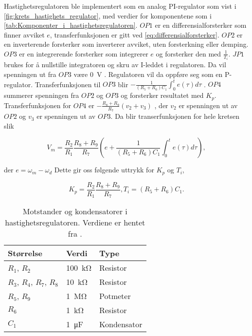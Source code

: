 Hastighetsregulatoren ble implementert som en analog PI-regulator som vist i \autoref{fig:krets_hastighets_regulator}, med verdier for komponentene som i \autoref{tab:Komponenter_i_hastighetsregulatoren}. $OP1$ er en differensialforsterker som finner avviket $e$, transferfunksjonen er gitt ved \eqref{eq:differensialforsterker}.
$OP2$ er en inverterende forsterker som inverterer avviket, uten forsterkning eller demping.
$OP3$ er en integrerende forsterker som integrerer $e$ og forsterker den med $\frac{1}{T_i}$.
$JP1$ brukes for å nullstille integratoren og skru av I-leddet i regulatoren.
Da vil spenningen ut fra $OP3$ være \SI{0}{\volt} \cite{AnalogMotorlabbOppgaver}.
Regulatoren vil da oppføre seg som en P-regulator.
Transferfunksjonen til $OP3$ blir $-\frac{1}{(R_5 + R_6) C_1} \int^t_0 e(\tau) d\tau$ \cite{Johnson}.
$OP4$ summerer spenningen fra $OP2$ og $OP3$ og forsterker resultatet med $K_p$.
Transferfunksjonen for $OP4$ er $-\frac{R_8 + R_9}{R_7}(v_2 + v_3)$ \cite{Johnson}, der $v_2$ er spenningen ut av $OP2$ og $v_3$ er spenningen ut av $OP3$. 
Da blir transerfunksjonen for hele kretsen slik

\begin{equation}
    \label{eq:hastighet_regulator_transferfuksjon}
    V_m =
    \frac{R_2}{R_1} \frac{R_8 + R_9}{R_7} \left(e + \frac{1}{(R_5 + R_6) C_1} \int^t_0 e(\tau) d\tau \right),
\end{equation}

der $e = \omega_m - \omega_d$
Dette gir oss følgende uttrykk for $K_p$ og $T_i$,

\begin{equation}
    \label{eq:K_p_og_T_i}
    K_p = \frac{R_2}{R_1} \frac{R_8 + R_9}{R_7}, 
    T_i = (R_5 + R_6) C_1.
\end{equation}

\begin{table}[h]
    \centering
    \caption{Motstander og kondensatorer i hastighetsregulatoren. Verdiene er hentet fra \cite{AnalogMotorlabbOppgaver}.}
    \begin{tabular}{lll}
        \toprule
        Størrelse & Verdi & Type \\
		\midrule
        $R_1$, $R_2$ & \SI{100}{\kilo\ohm} & Resistor\\
        $R_3$, $R_4$, $R_7$, $R_8$ & \SI{10}{\kilo\ohm} & Resistor \\
        $R_5$, $R_9$ & \SI{1}{\mega\ohm} & Potmeter \\
        $R_6$ & \SI{1}{\kilo\ohm} & Resistor \\
        $C_1$ & \SI{1}{\micro\farad} & Kondensator \\
        \bottomrule
    \end{tabular}
    \label{tab:Komponenter_i_hastighetsregulatoren}
\end{table}






